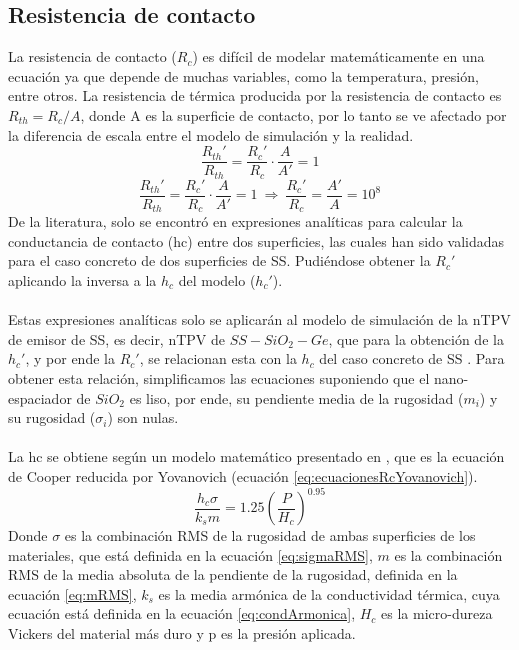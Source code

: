 \subsection{Resistencia de contacto}\label{sec:metodos_Rc}
La resistencia de contacto ($R_c$) es difícil de modelar matemáticamente en una ecuación ya que depende de muchas variables, como la temperatura, presión, entre otros. La resistencia de térmica producida por la resistencia de contacto es $R_{th}=R_{c}/A$, donde A es la superficie de contacto, por lo tanto se ve afectado por la diferencia de escala entre el modelo de simulación y la realidad.
\[ \dfrac{R_{th}'}{R_{th}}=\dfrac{R_c'}{R_c}\cdot \dfrac{A}{A'}=1 \]
\begin{equation}
	\dfrac{R_{th}'}{R_{th}}=\dfrac{R_c'}{R_c}\cdot \dfrac{A}{A'}=1 \ \Longrightarrow \  \dfrac{R_c'}{R_c}=\dfrac{A'}{A}=10^8
	\label{eq:relacion_Rc}
\end{equation}
De la literatura, solo se encontró en \cite{experimental_Rc_SS} expresiones analíticas para calcular la conductancia de contacto (\gls{hc}) entre dos superficies, las cuales han sido validadas para el caso concreto de dos superficies de SS. Pudiéndose obtener la $R_c'$ aplicando la inversa a la $h_c$ del modelo ($h_c'$).\\\\
Estas expresiones analíticas solo se aplicarán al modelo de simulación de la nTPV de emisor de SS, es decir, nTPV de $SS-SiO_2-Ge$, que para la obtención de la $h_c'$, y por ende la $R_c'$, se relacionan esta con la $h_c$ del caso concreto de SS \cite{experimental_Rc_SS}. Para obtener esta relación, simplificamos las ecuaciones suponiendo que el nano-espaciador de $SiO_2$ es liso, por ende, su pendiente media de la rugosidad ($m_i$) y su rugosidad ($\sigma_i$) son nulas.\\\\
La \gls{hc} se obtiene según un modelo matemático presentado en \cite{experimental_Rc_SS}, que es la ecuación de Cooper reducida por Yovanovich (ecuación \eqref{eq:ecuacionesRcYovanovich}).\\
\begin{equation}
\dfrac{h_c\sigma}{k_sm}=1.25\left(\dfrac{P}{H_c}\right)^{0.95}
\label{eq:ecuacionesRcYovanovich}
\end{equation}
Donde $\sigma$ es la combinación RMS de la rugosidad de ambas superficies de los materiales, que está definida en la ecuación \eqref{eq:sigmaRMS}, $m$ es la combinación RMS de la media absoluta de la pendiente de la rugosidad, definida en la ecuación \eqref{eq:mRMS}, $k_s$ es la media armónica de la conductividad térmica, cuya ecuación está definida en la ecuación \eqref{eq:condArmonica}, $H_c$ es la micro-dureza Vickers del material más duro y \gls{p} es la presión aplicada.\\
